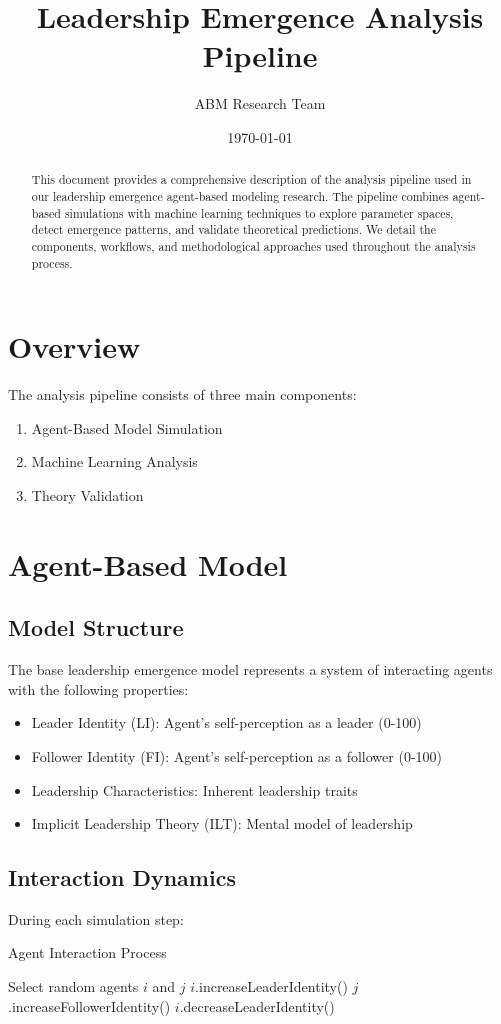 \documentclass[11pt]{article}
\title{Leadership Emergence Analysis Pipeline}
\author{ABM Research Team}
\date{\today}
\begin{document}
\maketitle

\begin{abstract}
This document provides a comprehensive description of the analysis pipeline used in our leadership emergence agent-based modeling research. The pipeline combines agent-based simulations with machine learning techniques to explore parameter spaces, detect emergence patterns, and validate theoretical predictions. We detail the components, workflows, and methodological approaches used throughout the analysis process.
\end{abstract}

\section{Overview}
The analysis pipeline consists of three main components:
\begin{enumerate}
    \item Agent-Based Model Simulation
    \item Machine Learning Analysis
    \item Theory Validation
\end{enumerate}

\section{Agent-Based Model}
\subsection{Model Structure}
The base leadership emergence model represents a system of interacting agents with the following properties:
\begin{itemize}
    \item Leader Identity (LI): Agent's self-perception as a leader (0-100)
    \item Follower Identity (FI): Agent's self-perception as a follower (0-100)
    \item Leadership Characteristics: Inherent leadership traits
    \item Implicit Leadership Theory (ILT): Mental model of leadership
\end{itemize}

\subsection{Interaction Dynamics}
During each simulation step:
\begin{algorithm}[H]
\caption{Agent Interaction Process}
\begin{algorithmic}[1]
\State Select random agents $i$ and $j$
        \State $i$.increaseLeaderIdentity()
        \State $j$.increaseFollowerIdentity()
    \Else
        \State $i$.decreaseLeaderIdentity()
    \EndIf
\EndIf
\end{algorithmic}
\end{algorithm}
\end{document}
